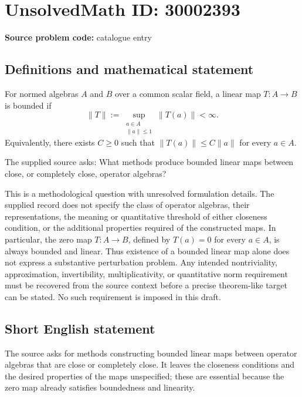 \documentclass[11pt]{article}
\begin{document}
\section*{UnsolvedMath ID: 30002393}
\textbf{Source problem code:} catalogue entry
\subsection{Definitions and mathematical statement}
For normed algebras \(A\) and \(B\) over a common scalar field, a linear map \(T\colon A\to B\) is bounded if
\[
\|T\|:=\sup_{\substack{a\in A\\ \|a\|\leq 1}}\|T(a)\|<\infty.
\]
Equivalently, there exists \(C\geq 0\) such that \(\|T(a)\|\leq C\|a\|\) for every \(a\in A\).

The supplied source asks: What methods produce bounded linear maps between close, or completely close, operator algebras?

This is a methodological question with unresolved formulation details. The supplied record does not specify the class of operator algebras, their representations, the meaning or quantitative threshold of either closeness condition, or the additional properties required of the constructed maps. In particular, the zero map \(T\colon A\to B\), defined by \(T(a)=0\) for every \(a\in A\), is always bounded and linear. Thus existence of a bounded linear map alone does not express a substantive perturbation problem. Any intended nontriviality, approximation, invertibility, multiplicativity, or quantitative norm requirement must be recovered from the source context before a precise theorem-like target can be stated. No such requirement is imposed in this draft.
\subsection{Short English statement}
The source asks for methods constructing bounded linear maps between operator algebras that are close or completely close. It leaves the closeness conditions and the desired properties of the maps unspecified; these are essential because the zero map already satisfies boundedness and linearity.
\end{document}
